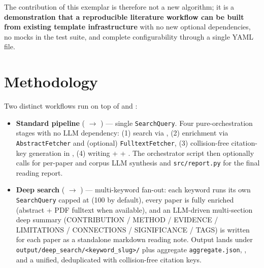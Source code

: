 \documentclass[
  english,
]{article}
\providecommand{\tightlist}{%
  \setlength{\itemsep}{0pt}\setlength{\parskip}{0pt}}
\begin{document}
The contribution of this exemplar is therefore not a new algorithm; it
is a \textbf{demonstration that a reproducible literature workflow can
be built from existing template infrastructure} with no new optional
dependencies, no mocks in the test suite, and complete configurability
through a single YAML file.

\newpage

\section{Methodology}\label{sec:methodology}

Two distinct workflows run on top of
 and
:

\begin{itemize}
\tightlist
\item
  \textbf{Standard pipeline} (
  \texorpdfstring{\ensuremath{\to}}{->} ) --- single
  \texttt{SearchQuery}. Four pure-orchestration stages with no LLM
  dependency: (1) search via , (2) enrichment
  via \texttt{AbstractFetcher} and (optional) \texttt{FulltextFetcher},
  (3) collision-free citation-key generation in
  , (4) writing
   +  +
  . The orchestrator script then
  optionally calls  for per-paper and corpus
  LLM synthesis and \texttt{src/report.py} for the final reading report.
\item
  \textbf{Deep search} ( \texorpdfstring{\ensuremath{\to}}{->}
  ) --- multi-keyword
  fan-out: each keyword runs its own \texttt{SearchQuery} capped at
   (100 by default), every paper is
  fully enriched (abstract + PDF fulltext when available), and an
  LLM-driven multi-section deep summary (CONTRIBUTION / METHOD /
  EVIDENCE / LIMITATIONS / CONNECTIONS / SIGNIFICANCE / TAGS) is written
  for each paper as a standalone markdown reading note. Output lands
  under
  \texttt{output/deep\_search/\textless{}keyword\_slug\textgreater{}/}
  plus aggregate \texttt{aggregate.json}, ,
  and a unified, deduplicated 
  with collision-free citation keys.
\end{itemize}
\end{document}
